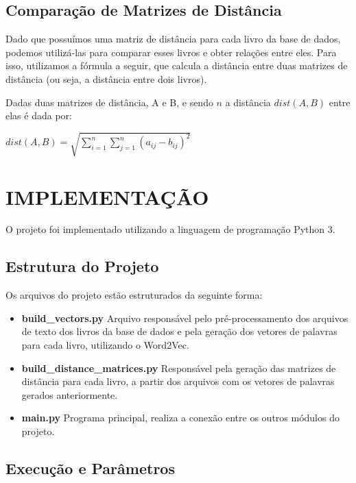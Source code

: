 \documentclass[12pt]{article}
\begin{document}
\subsection{Comparação de Matrizes de Distância}

Dado que possuímos uma matriz de distância para cada livro da base de dados, podemos utilizá-las
para comparar esses livros e obter relações entre eles. Para isso, utilizamos a fórmula a seguir,
que calcula a distância entre duas matrizes de distância (ou seja, a distância entre dois livros).

Dadas duas matrizes de distância, A e B, e sendo $ n $ a distância $ dist(A, B) $
entre elas é dada por:

\begin{center}
 $ dist(A, B) = \sqrt{ \sum_{i=1}^{n} \sum_{j=1}^{n} (a_{ij} - b_{ij})^2 } $
\end{center}

\section{IMPLEMENTAÇÃO}

O projeto foi implementado utilizando a linguagem de programação Python 3.

\subsection{Estrutura do Projeto}

Os arquivos do projeto estão estruturados da seguinte forma:

\begin{itemize}
 \item \textbf{build\_vectors.py} Arquivo responsável pelo pré-processamento dos arquivos de
 texto dos livros da base de dados e pela geração dos vetores de palavras para cada livro,
 utilizando o Word2Vec.
 
 \item \textbf{build\_distance\_matrices.py} Responsável pela geração das matrizes de distância
 para cada livro, a partir dos arquivos com os vetores de palavras gerados anteriormente.
 
 \item \textbf{main.py} Programa principal, realiza a conexão entre os outros módulos do projeto.
\end{itemize}

\subsection{Execução e Parâmetros}
\end{document}
